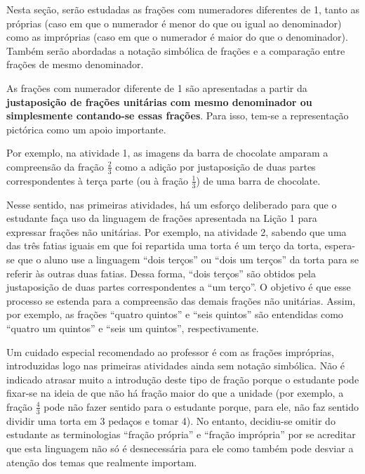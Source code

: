 
\noindent {\color{special}{\Large \bf LIÇÃO 2 - Para o professor}}
\vspace{.5cm}

Nesta seção, serão estudadas as frações com numeradores diferentes de 1, tanto as próprias (caso em que o numerador é menor do que ou igual ao denominador) como as impróprias (caso em que o numerador é maior do que o denominador).
Também serão abordadas a notação simbólica de frações e a comparação entre frações de mesmo denominador.

As frações com numerador diferente de 1 são apresentadas a partir da {\bf justaposição de frações unitárias com mesmo denominador ou simplesmente contando-se essas frações}. Para isso, tem-se a representação pictórica como um apoio importante.

Por exemplo, na atividade 1, as imagens da barra de chocolate amparam a compreensão da fração $\frac{2}{3}$ como a adição por justaposição de duas partes correspondentes à terça parte (ou à fração $\frac{1}{3}$) de uma barra de chocolate.

Nesse sentido, nas primeiras atividades, há um esforço deliberado para que o estudante faça uso da linguagem de frações apresentada na Lição 1 para expressar frações não unitárias. Por exemplo, na atividade 2, sabendo que uma das três fatias iguais em que foi repartida uma torta é um terço da torta, espera-se que o aluno use a linguagem ``dois terços'' ou ``dois um terços'' da torta para se referir às outras duas fatias. Dessa forma, ``dois terços'' são obtidos pela justaposição de duas partes correspondentes a ``um terço''. O objetivo é que esse processo se estenda para a compreensão das demais frações não unitárias. Assim, por exemplo, as frações ``quatro quintos'' e ``seis quintos'' são entendidas como ``quatro um quintos'' e ``seis um quintos'', respectivamente.

Um cuidado especial recomendado ao professor é com as frações impróprias, introduzidas logo nas primeiras atividades ainda sem notação simbólica. Não é indicado atrasar muito a introdução deste tipo de fração porque o estudante pode fixar-se na ideia de que não há fração maior do que a unidade  (por exemplo, a fração $\frac{4}{3}$ pode não fazer sentido para o estudante porque, para ele, não faz sentido dividir uma torta em 3 pedaços e tomar 4). No entanto, decidiu-se omitir do estudante as terminologias ``fração própria'' e ``fração imprópria'' por se acreditar que esta linguagem não só é desnecessária para ele como também pode desviar a atenção dos temas que realmente importam.

